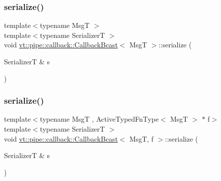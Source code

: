 \subsubsection{\texorpdfstring{serialize()}{serialize()}\hspace{0.1cm}{\footnotesize\ttfamily [1/2]}}
{\footnotesize\ttfamily template$<$typename MsgT $>$ \\
template$<$typename SerializerT $>$ \\
void \hyperlink{structvt_1_1pipe_1_1callback_1_1_callback_bcast}{vt\+::pipe\+::callback\+::\+Callback\+Bcast}$<$ MsgT $>$\+::serialize (\begin{DoxyParamCaption}\item[{SerializerT \&}]{s }\end{DoxyParamCaption})\hspace{0.3cm}{\ttfamily [inline]}}

\mbox{\label{structvt_1_1pipe_1_1callback_1_1_callback_bcast_a1eadd931f74a579b9ec5830006aaf32c}} 
\subsubsection{\texorpdfstring{serialize()}{serialize()}\hspace{0.1cm}{\footnotesize\ttfamily [2/2]}}
{\footnotesize\ttfamily template$<$typename MsgT , Active\+Typed\+Fn\+Type$<$ Msg\+T $>$ $\ast$ f$>$ \\
template$<$typename SerializerT $>$ \\
void \hyperlink{structvt_1_1pipe_1_1callback_1_1_callback_bcast}{vt\+::pipe\+::callback\+::\+Callback\+Bcast}$<$ MsgT, f $>$\+::serialize (\begin{DoxyParamCaption}\item[{SerializerT \&}]{s }\end{DoxyParamCaption})}

\mbox{\label{structvt_1_1pipe_1_1callback_1_1_callback_bcast_a839f195f5e4dae3251d67163016ae703}} 
